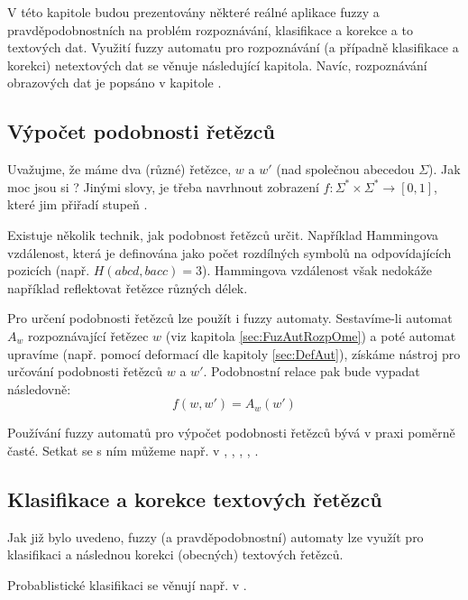 \documentclass[a4paper,10pt]{article}
\begin{document}
V této kapitole budou prezentovány některé reálné aplikace fuzzy a pravděpodobnostních  na problém rozpoznávání, klasifikace a korekce a to textových dat. Využití fuzzy automatu pro rozpoznávání (a případně klasifikace a korekci) netextových dat se věnuje následující kapitola. Navíc, rozpoznávání obrazových dat je popsáno v kapitole .

\subsection{Výpočet podobnosti řetězců}
Uvažujme, že máme dva (různé) řetězce, $w$ a $w'$ (nad společnou abecedou $\Sigma$). Jak moc jsou si ? Jinými slovy, je třeba navrhnout zobrazení $f: \Sigma^* \times \Sigma^* \rightarrow [0,1]$, které jim přiřadí stupeň .

Existuje několik technik, jak podobnost řetězců určit. Například Hammingova vzdálenost, která je definována jako počet rozdílných symbolů na odpovídajících pozicích (např. $H(abcd, bacc) = 3$). Hammingova vzdálenost však nedokáže například reflektovat řetězce různých délek.

Pro určení podobnosti řetězců lze použít i fuzzy automaty. Sestavíme-li automat $A_w$ rozpoznávající řetězec $w$ (viz kapitola \ref{sec:FuzAutRozpOme}) a poté automat upravíme (např. pomocí deformací dle kapitoly \ref{sec:DefAut}), získáme nástroj pro určování podobnosti řetězců $w$ a $w'$. Podobnostní relace pak bude vypadat následovně:
$$
   f(w, w') = A_w(w')
$$

Používání fuzzy automatů pro výpočet podobnosti řetězců bývá v praxi poměrně časté. Setkat se s ním můžeme např. v \cite{AndAbdAsm-ApprPattMatcFuzzLog}, \cite{Gar+-DefFuzAutCorImpStrFuzSym}, \cite{Ast+-ImpStrMaExpUsDefFuzAut}, \cite{RamGir-ConvFinAutFuzzAutStrComp}, \cite{SetWar-FuzzAutPattMatc}.

\subsection{Klasifikace a korekce textových řetězců}
Jak již bylo uvedeno, fuzzy (a pravděpodobnostní) automaty lze využít pro klasifikaci a následnou korekci (obecných) textových řetězců. 

Probablistické klasifikaci se věnují např. v \cite{HigOnc-ComMosProStrProFiStaMa}.
\end{document}
